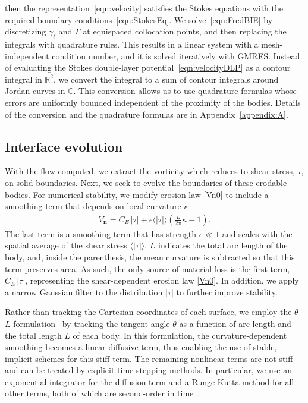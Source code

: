 \documentclass[3p]{elsarticle}
\newcommand{\edit}[1]{{\color{red} #1}}
\newcommand{\CC}{{\mathbb{C}}}
\newcommand{\nn}{{\mathbf{n}}}
\newcommand{\RR}{{\mathbb{R}}}
\newcommand{\abs}[1]{\left| #1 \right|}
\newcommand{\Vn}{V_\nn}
\newcommand{\CE}{C_E}
\newcommand{\thL}{$\theta$--$L$}
\begin{document}
then the representation~\eqref{eqn:velocity} satisfies the Stokes
equations with the required boundary conditions~\eqref{eqn:StokesEq}. We
solve~\eqref{eqn:FredBIE} by discretizing $\gamma_\ell$ and $\Gamma$ at
equispaced collocation points, and then replacing the integrals with
quadrature rules. This results in a linear system with a
mesh-independent condition number, and it is solved iteratively with
GMRES. Instead of evaluating the Stokes double-layer
potential~\eqref{eqn:velocityDLP} as a contour integral in $\RR^2$, we
convert the integral to a sum of contour integrals around Jordan curves
in $\CC$. \edit{This conversion allows us to use quadrature formulas
whose errors are uniformly bounded independent of the proximity of the
bodies. Details of the conversion and the quadrature formulas are in
Appendix~\ref{appendix:A}.}

\subsection{Interface evolution}
\label{sec:int_evo}

With the flow computed, we extract the vorticity which reduces to shear stress, $\tau$, on solid boundaries. Next, we seek to evolve the boundaries of these erodable bodies. For numerical stability, we modify erosion law \eqref{Vn0} to include a smoothing term that depends on local curvature $\kappa$~\cite{quaife2018boundary}
\begin{align}
  \Vn = \CE \, \abs{\tau} + \epsilon \langle\abs{\tau}\rangle \left(
    \frac{L}{2\pi} \kappa - 1 \right).
\end{align}
The last term is a smoothing term that has strength $\epsilon \ll 1$ and scales with the spatial average of the shear stress $\langle\abs{\tau}\rangle$. $L$ indicates the total arc length of the body, and, inside the parenthesis, the mean curvature is subtracted so that this term preserves area. As such, the only source of material loss is the first term, $\CE \, \abs{\tau}$, representing the shear-dependent erosion law \eqref{Vn0}. In addition, we apply a narrow Gaussian filter to the distribution $\abs{\tau}$ to further improve stability.

Rather than tracking the Cartesian coordinates of each surface, we employ the {\thL} formulation~\cite{hou-low-she1994, Moore2013, MooreCPAM2017, mac2022morphological} by tracking the tangent angle $\theta$ as a function of arc length and the total length $L$ of each body. In this formulation, the curvature-dependent smoothing becomes a linear diffusive term, thus enabling the use of stable, implicit schemes for this stiff term. The remaining nonlinear terms are not stiff and can be treated by explicit time-stepping methods. In particular, we use an exponential integrator for the diffusion term and a Runge-Kutta method for all other terms, both of which are second-order in time~\cite{quaife2018boundary}.
\end{document}
